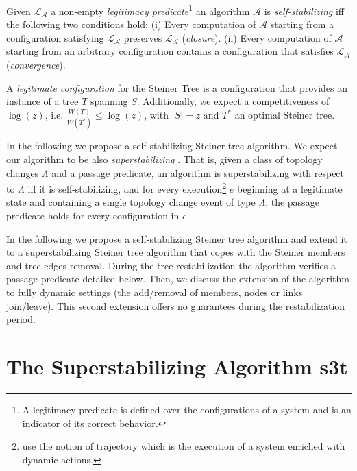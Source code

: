 \documentclass[11pt]{article}
\newcommand{\STT}{{\sc s3t}}
\begin{document}
Given $\mathcal{L_{A}}$ a non-empty
\emph{legitimacy predicate}\footnote{A legitimacy predicate is 
defined over the configurations of a system and 
is an indicator of its correct behavior.} 
an algorithm $\mathcal{A}$ is \emph{self-stabilizing} 
iff
the following two conditions hold:
\textsf{(i)} Every computation of $\mathcal{A}$ starting from a configuration
satisfying $\mathcal{L_A}$ preserves $\mathcal{L_A}$ (\emph{closure}).  
\textsf{(ii)} Every computation of $\mathcal{A}$ starting from an arbitrary configuration
contains a configuration that satisfies $\mathcal{L_A}$
(\emph{convergence}).

A {\it legitimate configuration} for the Steiner Tree is a
configuration that provides an instance of a tree $T$ spanning $S$. 
Additionally, we expect a competitiveness of $\log(z)$, 
i.e. $\frac{W(T)}{W(T^*)} \leq \log(z)$, with $|S|=z$ and $T^*$ an optimal Steiner tree.

In the following we propose a self-stabilizing Steiner tree algorithm.
We expect our algorithm to be also {\it superstabilizing}
\cite{Dolev_SuperStab}. That is, 
given a class of topology changes $\Lambda$ and a passage predicate, an algorithm 
is superstabilizing with respect to $\Lambda$ iff it
is self-stabilizing, and for every
execution\footnote{\cite{Dolev_SuperStab} use the notion of trajectory
which is the execution of a system enriched with dynamic actions.} $e$ beginning at a
legitimate state and containing a single topology change event of type
$\Lambda$, the passage predicate holds for every configuration in $e$.










In the following we propose a self-stabilizing Steiner tree algorithm and
extend it 
to a superstabilizing Steiner tree algorithm
that copes with the Steiner members and tree edges removal. During the tree
restabilization the algorithm verifies a passage predicate detailed below. 
Then, we discuss the extension of the algorithm to fully dynamic
settings (the add/removal of members, nodes or links join/leave). 
This second extension offers no guarantees during the restabilization period.


\section{The Superstabilizing Algorithm \STT}
\end{document}
